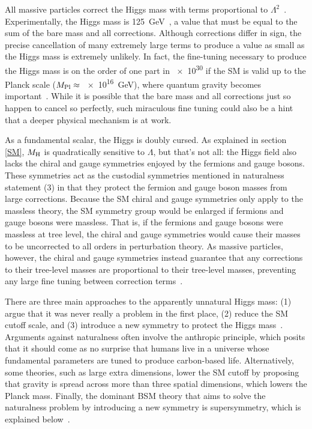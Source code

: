\documentclass[12pt]{article}
\begin{document}
    All massive particles correct the Higgs mass with terms proportional to $\Lambda^2$~\cite{dine_naturalness}. Experimentally, the Higgs mass is \SI{125}{\giga\electronvolt}~\cite{cms_higgs, atlas_higgs}, a value that must be equal to the sum of the bare mass and all corrections. Although corrections differ in sign, the precise cancellation of many extremely large terms to produce a value as small as the Higgs mass is extremely unlikely. In fact, the fine-tuning necessary to produce the Higgs mass is on the order of one part in \num{e30} if the SM is valid up to the Planck scale ($M_{\mathrm{Pl}}\approx$ \SI{e16}{\giga\electronvolt}), where quantum gravity becomes important~\cite{giudice_naturally}. While it is possible that the bare mass and all corrections just so happen to cancel so perfectly, such miraculous fine tuning could also be a hint that a deeper physical mechanism is at work.
    
    As a fundamental scalar, the Higgs is doubly cursed. As explained in section \ref{SM}, $M_{\mathrm{H}}$ is quadratically sensitive to $\Lambda$, but that's not all: the Higgs field also lacks the chiral and gauge symmetries enjoyed by the fermions and gauge bosons. These symmetries act as the custodial symmetries mentioned in naturalness statement (3) in that they protect the fermion and gauge boson masses from large corrections. Because the SM chiral and gauge symmetries only apply to the massless theory, the SM symmetry group would be enlarged if fermions and gauge bosons were massless. That is, if the fermions and gauge bosons were massless at tree level, the chiral and gauge symmetries would cause their masses to be uncorrected to all orders in perturbation theory. As massive particles, however, the chiral and gauge symmetries instead guarantee that any corrections to their tree-level masses are proportional to their tree-level masses, preventing any large fine tuning between correction terms~\cite{giudice_naturally}.  

     There are three main approaches to the apparently unnatural Higgs mass: (1) argue that it was never really a problem in the first place, (2) reduce the SM cutoff scale, and (3) introduce a new symmetry to protect the Higgs mass~\cite{craig}. Arguments against naturalness often involve the anthropic principle, which posits that it should come as no surprise that humans live in a universe whose fundamental parameters are tuned to produce carbon-based life. Alternatively, some theories, such as large extra dimensions, lower the SM cutoff by proposing that gravity is spread across more than three spatial dimensions, which lowers the Planck mass. Finally, the dominant BSM theory that aims to solve the naturalness problem by introducing a new symmetry is supersymmetry, which is explained below~\cite{dine_naturalness}.
    
\end{document}
